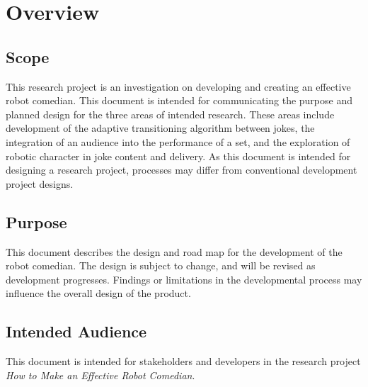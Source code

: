 \documentclass[onecolumn, draftclsnofoot,10pt, compsoc]{IEEEtran}
\begin{document}
\section{Overview}

\subsection{Scope}
	This research project is an investigation on developing and creating an effective robot comedian.
	This document is intended for communicating the purpose and planned design for the three areas of intended research.
	These areas include development of the adaptive transitioning algorithm between jokes, the integration of an audience into the performance of a set, and the exploration of robotic character in joke content and delivery.
	As this document is intended for designing a research project, processes may differ from conventional development project designs.

\subsection{Purpose}
	This document describes the design and road map for the development of the robot comedian. The design is subject to change, and will be revised as development progresses. Findings or limitations in the developmental process may influence the overall design of the product.

\subsection{Intended Audience}
	This document is intended for stakeholders and developers in the research project \textit{How to Make an Effective Robot Comedian}.

\end{document}
